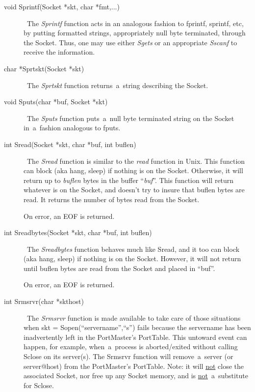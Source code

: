 \documentclass[12pt]{article}
\begin{document}
\begin{description}
\item[void Sprintf(Socket *skt, char *fmt,...)] \     The {\em Sprintf} function acts in an analogous fashion to fprintf,
    sprintf, etc, by putting formatted strings, appropriately null byte
    terminated,  through the Socket.  Thus, one may use either {\em Sgets} or
    an appropriate {\em Sscanf} to receive the information.

\item[char *Sprtskt(Socket *skt)] \     The {\em Sprtskt} function returns~a~string describing the Socket.

\item[void Sputs(char *buf, Socket *skt)] \     The {\em Sputs} function puts~a~null byte terminated string on the Socket
    in~a~fashion analogous to fputs.

\item[int Sread(Socket *skt, char *buf, int buflen)] \     The {\em Sread} function is similar to the {\em read}
    function in Unix.  This function can block (aka hang, sleep) if nothing is
    on the Socket.  Otherwise, it will return up to {\em buflen} bytes in the
    buffer ``{\em buf}''.  This function will return whatever is on the Socket,
    and doesn't try to insure that buflen bytes are read.  It returns the
    number of bytes read from the Socket.

    On error, an EOF is returned.

\item[int Sreadbytes(Socket *skt, char *buf, int buflen)] \     The {\em Sreadbytes} function behaves much like Sread, and it too can block
    (aka hang, sleep) if nothing is on the Socket.  However, it will not return
    until buflen bytes are read from the Socket and placed in ``buf''.

    On error, an EOF is returned.

\item[int Srmsrvr(char *skthost)] \     The {\em Srmsrvr} function is made available to take care of those
    situations when {\small skt = Sopen(``servername'',``s'')} fails because
    the servername has been inadvertently left in the PortMaster's PortTable.
    This untoward event can happen, for example, when~a~process is
    aborted/exited without calling Sclose on its server(s).  The Srmsrvr
    function will remove~a~server (or server@host) from the PortMaster's
    PortTable.  Note: it will \underline{not} close the associated Socket, nor
    free up any Socket memory, and is \underline{not}~a~substitute for Sclose.


\end{description}
\end{document}
